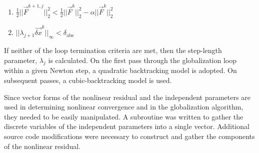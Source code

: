 \begin{enumerate}
\item{$\frac{1}{2}||\vec{F}^{k+1, j}||^{2}_{2} < \frac{1}{2}||\vec{F}^{k}||^{2}_{2} - \alpha ||\vec{F}^{k}||^{2}_{2}$ }
\item{$||\lambda_{j+1} \vec{\delta x}^{k}||_{\infty} < \delta_{\text{abs}}$}
\end{enumerate}

If neither of the loop termination criteria are met, then the step-length parameter, $\lambda_j$ is calculated.
On the first pass through the globalization loop within a given Newton step, a quadratic backtracking model is adopted.
On subsequent passes, a cubic-backtracking model is used.
 
Since vector forms of the nonlinear residual and the independent parameters are used in determining nonlinear convergence and in the globalization algorithm, they needed to be easily manipulated.
A subroutine was written to gather the discrete variables of the independent parameters into a single vector.
Additional source code modifications were necessary to construct and gather the components of the nonlinear residual.

